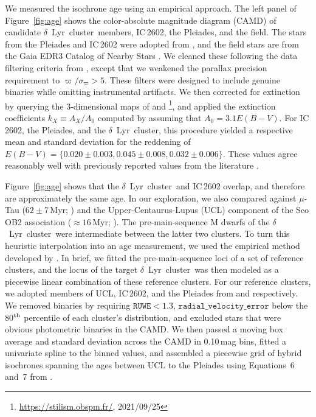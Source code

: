 \documentclass[12pt,modern,twocolumn,tighten]{aastex63}
\newcommand{\cn}{$\delta$\ Lyr\ cluster} %
\begin{document}
We measured the isochrone age using an empirical approach.  The left
panel of Figure~\ref{fig:age} shows the color-absolute magnitude
diagram (CAMD) of candidate \cn\ members, IC\,2602, the Pleiades, and
the field.  The stars from the Pleiades and IC\,2602 were adopted from
\citet{CantatGaudin2018a}, and the field stars are from the Gaia EDR3
Catalog of Nearby Stars \citep{gaia_gcns_2021}.  We cleaned these
following the data filtering criteria from \citet[][Appendix
B]{GaiaCollaboration2018}, except that we weakened the parallax
precision requirement to $\varpi/\sigma_\varpi>5$.  These filters were
designed to include genuine binaries while omitting instrumental
artifacts.  We then corrected for extinction by querying the
3-dimensional maps of \citet{capitanio_threedimensional_2017} and
\citet{lallement_threedimensional_2018}\footnote{\url{https://stilism.obspm.fr/},
2021/09/25}, and applied the extinction coefficients $k_X\equiv
A_X/A_0$ computed by \citet{GaiaCollaboration2018} assuming that $A_0
= 3.1 E(B-V)$.  For IC\,2602, the Pleiades, and the \cn, this
procedure yielded a respective mean and standard deviation for the
reddening of $E(B-V)=\{0.020\pm0.003, 0.045\pm0.008, 0.032\pm0.006\}$.
These values agree reasonably well with previously reported values
from the literature \citep[{\it
e.g.},][]{GaiaCollaboration2018,KounkelCovey2019,bossini_age_2019}.

%
%
%

Figure~\ref{fig:age} shows that the \cn\ and IC\,2602 overlap, and
therefore are approximately the same age.  In our exploration, we also
compared against $\mu$-Tau ($62\pm7$\,Myr; \citealt{gagne_mutau_2020})
and the Upper-Centaurus-Lupus (UCL) component of the Sco OB2
association ($\approx$$16$\,Myr; \citealt{pecaut_star_2016}).  The
pre-main-sequence M dwarfs of the \cn\ were intermediate between the
latter two clusters.  To turn this heuristic interpolation into an age
measurement, we used the empirical method developed by
\citet{gagne_mutau_2020}.  In brief, we fitted the pre-main-sequence
loci of a set of reference clusters, and the locus of the target \cn\
was then modeled as a piecewise linear combination of these reference
clusters.  For our reference clusters, we adopted members of UCL,
IC\,2602, and the Pleiades from \citet{Damiani2019} and
\cite{CantatGaudin2018a} respectively.  We removed binaries by
requiring $\texttt{RUWE}<1.3$, $\texttt{radial\_velocity\_error}$
below the 80$^{\rm th}$ percentile of each cluster's distribution, and
excluded stars that were obvious photometric binaries in the CAMD.  We
then passed a moving box average and standard deviation across the
CAMD in 0.10\,mag bins, fitted a univariate spline to the binned
values, and assembled a piecewise grid of hybrid isochrones spanning
the ages between UCL to the Pleiades using Equations~6 and~7 from
\citet{gagne_mutau_2020}.  
\end{document}
